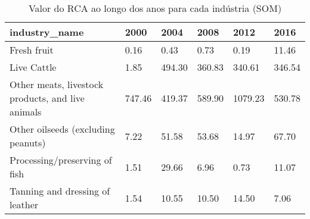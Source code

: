 \begin{table}
\centering
\caption{Valor do RCA ao longo dos anos para cada indústria (SOM)}
\begin{tabular}{p{6cm}p{1.5cm}p{1.5cm}p{1.5cm}p{1.5cm}p{1.5cm}}
\toprule
                                    industry\_name &   2000 &   2004 &   2008 &    2012 &   2016 \\
\midrule
                                      Fresh fruit &   0.16 &   0.43 &   0.73 &    0.19 &  11.46 \\
                                      Live Cattle &   1.85 & 494.30 & 360.83 &  340.61 & 346.54 \\
Other meats, livestock products, and live animals & 747.46 & 419.37 & 589.90 & 1079.23 & 530.78 \\
               Other oilseeds (excluding peanuts) &   7.22 &  51.58 &  53.68 &   14.97 &  67.70 \\
                    Processing/preserving of fish &   1.51 &  29.66 &   6.96 &    0.73 &  11.07 \\
                  Tanning and dressing of leather &   1.54 &  10.55 &  10.50 &   14.50 &   7.06 \\
\bottomrule
\end{tabular}
\end{table}
